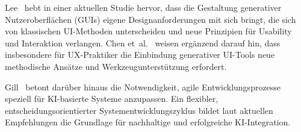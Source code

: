 Lee~\cite{lee_towards_2025} hebt in einer aktuellen Studie hervor, dass die
Gestaltung generativer Nutzeroberflächen (GUIs) eigene Designanforderungen mit
sich bringt, die sich von klassischen UI-Methoden unterscheiden und neue
Prinzipien für Usability und Interaktion verlangen. Chen
et~al.~\cite{chen_genui_2025} weisen ergänzend darauf hin, dass insbesondere
für UX-Praktiker die Einbindung generativer UI-Tools neue methodische Ansätze
und Werkzeugunterstützung erfordert.

Gill~\cite{gill_agile_202} betont darüber hinaus die Notwendigkeit, agile
Entwicklungsprozesse speziell für KI-basierte Systeme anzupassen. Ein
flexibler, entscheidungsorientierter Systementwicklungszyklus bildet laut
aktuellen Empfehlungen die Grundlage für nachhaltige und erfolgreiche
KI-Integration.


